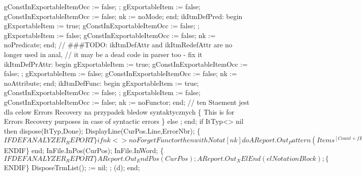                gConstInExportableItemOcc := false;
               ;
               gExportableItem := false;
               gConstInExportableItemOcc := false;
               nk := noMode;
            end;
         ikItmDefPred:
            begin
               gExportableItem := true;
               gConstInExportableItemOcc := false;
               ;
               gExportableItem := false;
               gConstInExportableItemOcc := false;
               nk := noPredicate;
            end;
         // ###TODO: ikItmDefAttr and ikItmRedefAttr are no longer used in anal,
         //           it may be a dead code in parser too - fix it
         ikItmDefPrAttr:
            begin
               gExportableItem := true;
               gConstInExportableItemOcc := false;
               ;
               gExportableItem := false;
               gConstInExportableItemOcc := false;
               nk := noAttribute;
            end;
         ikItmDefFunc:
            begin
               gExportableItem := true;
               gConstInExportableItemOcc := false;
               ;
               gExportableItem := false;
               gConstInExportableItemOcc := false;
               nk := noFunctor;
            end;
         // ten Staement jest dla celow Errors Recovery na przypadek bledow syntaktycznych
         \{ This  is for Errors Recovery purposes in case of syntactic errors \}
      else ;
      end;
      if ItTyp<> nil then dispose(ItTyp,Done);
      DisplayLine(CurPos.Line,ErrorNbr);
      \{$IFDEF ANALYZER_REPORT\}
      if nk <> noForgetFunctor then
         with Notat[nk] do
            AReport.Out_Pattern(Items^[Count + fExtCount - 1],
                                Count + fExtCount);
      \{$ENDIF\}
   end;
   InFile.InPos(CurPos); InFile.InWord;
   \{$IFDEF ANALYZER_REPORT\}
   AReport.Out_EndPos(CurPos);
   AReport.Out_XElEnd(elNotationBlock);
   \{$ENDIF\}
   DisposeTrmList();  := nil;
   ;
   (d);
end;
\eatline
